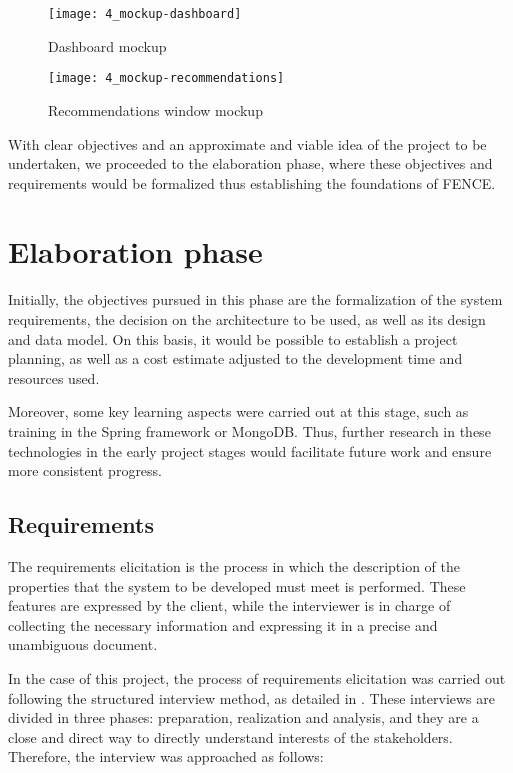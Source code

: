 \begin{figure}
	\centering
	\texttt{[image: 4\_mockup-dashboard]}
	\caption[Dashboard mockup]{Dashboard mockup}
	\label{fig:dash_mockup}
\end{figure}

\begin{figure}
	\centering
	\texttt{[image: 4\_mockup-recommendations]}
	\caption[Recommendations window mockup]{Recommendations window mockup}
	\label{fig:rec_mockup}
\end{figure}

With clear objectives and an approximate and viable idea of the project to be undertaken, we proceeded to the elaboration phase, where these objectives and requirements would be formalized thus establishing the foundations of FENCE.

\section{Elaboration phase}

Initially, the objectives pursued in this phase are the formalization of the system requirements, the decision on the architecture to be used, as well as its design and data model. On this basis, it would be possible to establish a project planning, as well as a cost estimate adjusted to the development time and resources used.

Moreover, some key learning aspects were carried out at this stage, such as training in the Spring framework or MongoDB. Thus, further research in these technologies in the early project stages would facilitate future work and ensure more consistent progress.

\subsection{Requirements}

The requirements elicitation is the process in which the description of the properties that the system to be developed must meet is performed. These features are expressed by the client, while the interviewer is in charge of collecting the necessary information and expressing it in a precise and unambiguous document.

In the case of this project, the process of requirements elicitation was carried out following the structured interview method, as detailed in \cite{toro_metodologia_2000}. These interviews are divided in three phases: preparation, realization and analysis, and they are a close and direct way to directly understand interests of the stakeholders. Therefore, the interview was approached as follows:


